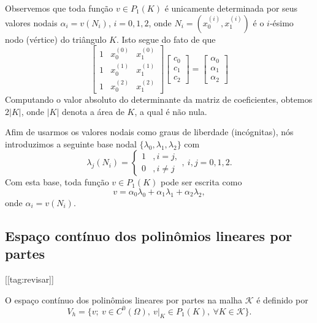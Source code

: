 Observemos que toda função $v\in P_1(K)$ é unicamente determinada por seus valores nodais $\alpha_i = v(N_i)$, $i=0, 1, 2$, onde $N_i = (x_0^{(i)}, x_1^{(i)})$ é o $i$-ésimo nodo (vértice) do triângulo $K$. Isto segue do fato de que
\begin{equation}
  \begin{bmatrix}
    1 & x_0^{(0)} & x_1^{(0)}\\
    1 & x_0^{(1)} & x_1^{(1)}\\
    1 & x_0^{(2)} & x_1^{(2)}
  \end{bmatrix}
  \begin{bmatrix}
    c_0\\
    c_1\\
    c_2
  \end{bmatrix} = 
  \begin{bmatrix}
    \alpha_0\\
    \alpha_1\\
    \alpha_2
  \end{bmatrix}
\end{equation}
Computando o valor absoluto do determinante da matriz de coeficientes, obtemos $2|K|$, onde $|K|$ denota a área de $K$, a qual é não nula.

Afim de usarmos os valores nodais como graus de liberdade (incógnitas), nós introduzimos a seguinte base nodal $\{\lambda_0, \lambda_1, \lambda_2\}$ com
\begin{equation}
  \lambda_j(N_i) = \left\{
    \begin{array}{ll}
      1 &, i=j,\\
      0 &, i\neq j
    \end{array}
\right.,~i,j=0,1,2.
\end{equation}
Com esta base, toda função $v\in P_1(K)$ pode ser escrita como
\begin{equation}
  v = \alpha_0\lambda_0 + \alpha_1\lambda_1 + \alpha_2\lambda_2,
\end{equation}
onde $\alpha_i = v(N_i)$.

\subsection{Espaço contínuo dos polinômios lineares por partes}
[[tag:revisar]]


O espaço contínuo dos polinômios lineares por partes na malha $\mathcal{K}$ é definido por
\begin{equation}
  V_h = \{v;~v\in C^0(\Omega),~v|_K\in P_1(K),~\forall K\in\mathcal{K}\}.
\end{equation}

